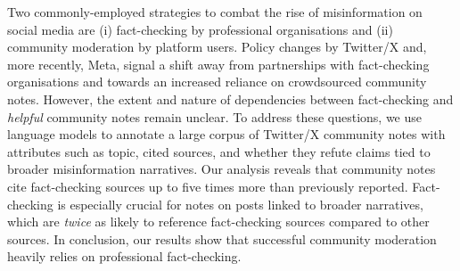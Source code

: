 

Two commonly-employed strategies to combat the rise of misinformation on social media are (i) fact-checking by professional organisations and (ii) community moderation by platform users. Policy changes by Twitter/X and, more recently, Meta, signal a shift away from partnerships with fact-checking organisations and towards an increased reliance on crowdsourced community notes. However, the extent and nature of dependencies between fact-checking and \emph{helpful} community notes remain unclear. To address these questions, we use language models to annotate a large corpus of Twitter/X community notes with attributes such as topic, cited sources, and whether they refute claims tied to broader misinformation narratives. Our analysis reveals that community notes cite fact-checking sources up to five times more than previously reported. Fact-checking is especially crucial for notes on posts linked to broader narratives, which are \textit{twice} as likely to reference fact-checking sources compared to other sources. In conclusion, our results show that successful community moderation heavily relies on professional fact-checking. 




